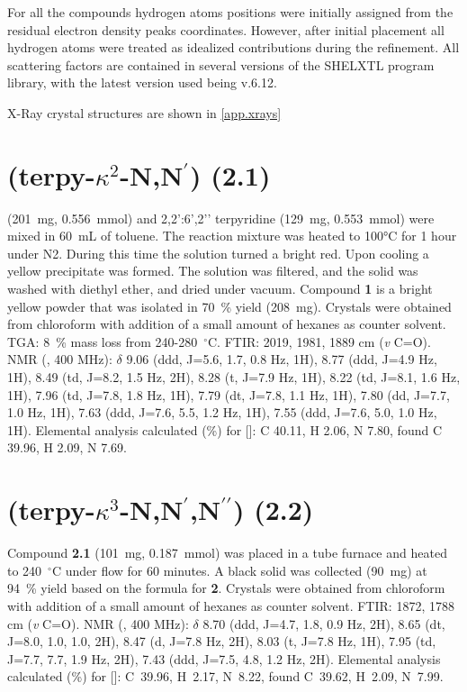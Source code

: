 For all the compounds hydrogen atoms positions were initially assigned from the residual electron density peaks coordinates. However, after initial placement all hydrogen atoms were treated as idealized contributions during the refinement. All scattering factors are contained in several versions of the SHELXTL program library, with the latest version used being v.6.12\autocite{sheldrick2008}.

X-Ray crystal structures are shown in \autoref{app.xrays}

\section{(terpy-$\kappa^2$-N,N$^\prime$) (\textbf{2.1})}\label{sec.c1}
 (201~mg,  0.556~mmol) and 2,2’:6’,2’’ terpyridine (129~mg, 0.553~mmol) were mixed in 60~mL of toluene. The reaction mixture was heated to 100°C for 1 hour under N2. During this time the solution turned a bright red. Upon cooling a yellow precipitate was formed. The solution was filtered, and the solid was washed with diethyl ether, and dried under vacuum. Compound \textbf{1} is a bright yellow powder that was isolated in 70~\% yield (208~mg). Crystals were obtained from chloroform with addition of a small amount of hexanes as counter solvent. TGA: 8~\% mass loss from 240-280~$^\circ$C.  FTIR: 2019, 1981, 1889 cm (\textit{v} C=O).  NMR (, 400 MHz): $\delta$ 9.06 (ddd, J=5.6, 1.7, 0.8 Hz, 1H), 8.77 (ddd, J=4.9 Hz, 1H), 8.49 (td, J=8.2, 1.5 Hz, 2H), 8.28 (t, J=7.9 Hz, 1H), 8.22 (td, J=8.1, 1.6 Hz, 1H), 7.96 (td, J=7.8, 1.8 Hz, 1H), 7.79 (dt, J=7.8, 1.1 Hz, 1H), 7.80 (dd, J=7.7, 1.0 Hz, 1H), 7.63 (ddd, J=7.6, 5.5, 1.2 Hz, 1H), 7.55 (ddd, J=7.6, 5.0, 1.0 Hz, 1H). Elemental analysis calculated (\%) for []: C 40.11, H 2.06, N 7.80, found C 39.96, H 2.09, N 7.69.

\section{(terpy-$\kappa^3$-N,N$^\prime$,N$^{\prime \prime}$) (\textbf{2.2})}\label{sec.c2}
Compound \textbf{2.1} (101~mg, 0.187~mmol) was placed in a tube furnace and heated to 240~$^\circ$C under  flow for 60 minutes. A black solid was collected (90~mg) at 94~\% yield based on the formula for \textbf{2}. Crystals were obtained from chloroform with addition of a small amount of hexanes as counter solvent. FTIR: 1872, 1788 cm (\textit{v} C=O).  NMR (, 400 MHz): $\delta$ 8.70 (ddd, J=4.7, 1.8, 0.9 Hz, 2H), 8.65 (dt, J=8.0, 1.0, 1.0, 2H), 8.47 (d, J=7.8 Hz, 2H), 8.03 (t, J=7.8 Hz, 1H), 7.95 (td, J=7.7, 7.7, 1.9 Hz, 2H), 7.43 (ddd, J=7.5, 4.8, 1.2 Hz, 2H). Elemental analysis calculated (\%) for []: C~39.96, H~2.17, N~8.22, found C~39.62, H~2.09, N~7.99.

